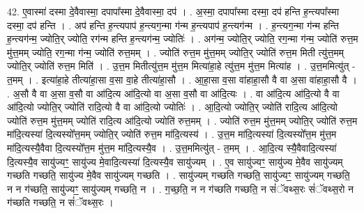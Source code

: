 \documentclass[17pt]{extarticle}
\begin{document}
42. ए॒वास्मा॑ दस्मा दे॒वैवास्मा॒ दपापा᳚स्मा दे॒वैवास्मा॒ दप॑ । . अ॒स्मा॒ दपापा᳚स्मा दस्मा॒ दप॑ हन्ति ह॒न्त्यपा᳚स्मा दस्मा॒ दप॑ हन्ति । . अप॑ हन्ति ह॒न्त्यपाप॑ ह॒न्त्यग॒न्मा ग॑न्म ह॒न्त्यपाप॑ ह॒न्त्यग॑न्म । . ह॒न्त्यग॒न्मा ग॑न्म हन्ति ह॒न्त्यग॑न्म॒ ज्योति॒र् ज्योति॒ रग॑न्म हन्ति ह॒न्त्यग॑न्म॒ ज्योतिः॑ । . अग॑न्म॒ ज्योति॒र् ज्योति॒ रग॒न्मा ग॑न्म॒ ज्योति॑ रुत्त॒म मु॑त्त॒मम् ज्योति॒ रग॒न्मा ग॑न्म॒ ज्योति॑ रुत्त॒मम् । . ज्योति॑ रुत्त॒म मु॑त्त॒मम् ज्योति॒र् ज्योति॑ रुत्त॒म मिती त्यु॑त्त॒मम् ज्योति॒र् ज्योति॑ रुत्त॒म मिति॑ । . उ॒त्त॒म मितीत्यु॑त्त॒म मु॑त्त॒म मित्या॑हा॒हे त्यु॑त्त॒म मु॑त्त॒म मित्या॑ह । . उ॒त्त॒ममित्यु॑त् - त॒मम् । . इत्या॑हा॒हे तीत्या॑हा॒सा व॒सा वा॒हे तीत्या॑हा॒सौ । . आ॒हा॒सा व॒सा वा॑हाहा॒सौ वै वा अ॒सा वा॑हाहा॒सौ वै । . अ॒सौ वै वा अ॒सा व॒सौ वा आ॑दि॒त्य आ॑दि॒त्यो वा अ॒सा व॒सौ वा आ॑दि॒त्यः । . वा आ॑दि॒त्य आ॑दि॒त्यो वै वा आ॑दि॒त्यो ज्योति॒र् ज्योति॑ रादि॒त्यो वै वा आ॑दि॒त्यो ज्योतिः॑ । . आ॒दि॒त्यो ज्योति॒र् ज्योति॑ रादि॒त्य आ॑दि॒त्यो ज्योति॑ रुत्त॒म मु॑त्त॒मम् ज्योति॑ रादि॒त्य आ॑दि॒त्यो ज्योति॑ रुत्त॒मम् । . ज्योति॑ रुत्त॒म मु॑त्त॒मम् ज्योति॒र् ज्योति॑ रुत्त॒म मा॑दि॒त्यस्या॑ दि॒त्यस्यो᳚त्त॒मम् ज्योति॒र् ज्योति॑ रुत्त॒म मा॑दि॒त्यस्य॑ । . उ॒त्त॒म मा॑दि॒त्यस्या॑ दि॒त्यस्यो᳚त्त॒म मु॑त्त॒म मा॑दि॒त्यस्यै॒वैवा दि॒त्यस्यो᳚त्त॒म मु॑त्त॒म मा॑दि॒त्यस्यै॒व । . उ॒त्त॒ममित्यु॑त् - त॒मम् । . आ॒दि॒त्य स्यै॒वैवादि॒त्यस्या॑ दि॒त्यस्यै॒व सायु॑ज्यꣳ॒॒ सायु॑ज्य मे॒वादि॒त्यस्या॑ दि॒त्यस्यै॒व सायु॑ज्यम् । . ए॒व सायु॑ज्यꣳ॒॒ सायु॑ज्य मे॒वैव सायु॑ज्यम् गच्छति गच्छति॒ सायु॑ज्य मे॒वैव सायु॑ज्यम् गच्छति । . सायु॑ज्यम् गच्छति गच्छति॒ सायु॑ज्यꣳ॒॒ सायु॑ज्यम् गच्छति॒ न न ग॑च्छति॒ सायु॑ज्यꣳ॒॒ सायु॑ज्यम् गच्छति॒ न । . ग॒च्छ॒ति॒ न न ग॑च्छति गच्छति॒ न सं॑ॅवथ्स॒रः सं॑ॅवथ्स॒रो न ग॑च्छति गच्छति॒ न सं॑ॅवथ्स॒रः । \newline
\end{document}
